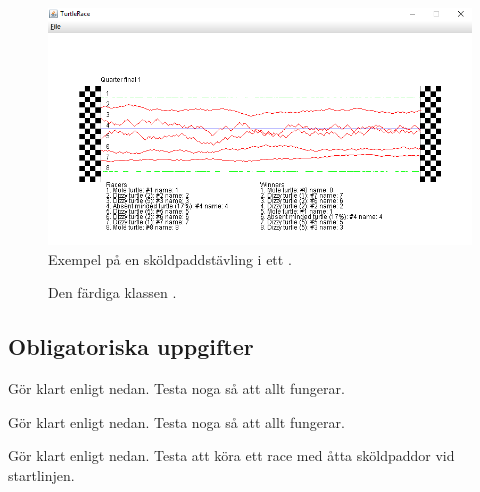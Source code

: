 \begin{figure}
\centering\includegraphics[width=1.02\textwidth, trim={1.5cm 0.2cm 1.5cm 3cm},clip]{../img/turtlerace/RaceWindow}
\caption{Exempel på en sköldpaddstävling i ett .}
\label{turtle-race:fig:race}
\end{figure}


\begin{figure}
  \caption{Den färdiga klassen .}
  \label{turtle-race:RaceWindow}
\end{figure}


\subsection{Obligatoriska uppgifter}

\Task Gör klart  enligt nedan. Testa noga så att allt fungerar.



\Task Gör klart  enligt nedan. Testa noga så att allt fungerar.


\Task Gör klart  enligt nedan. Testa att köra ett race med åtta sköldpaddor vid startlinjen.


